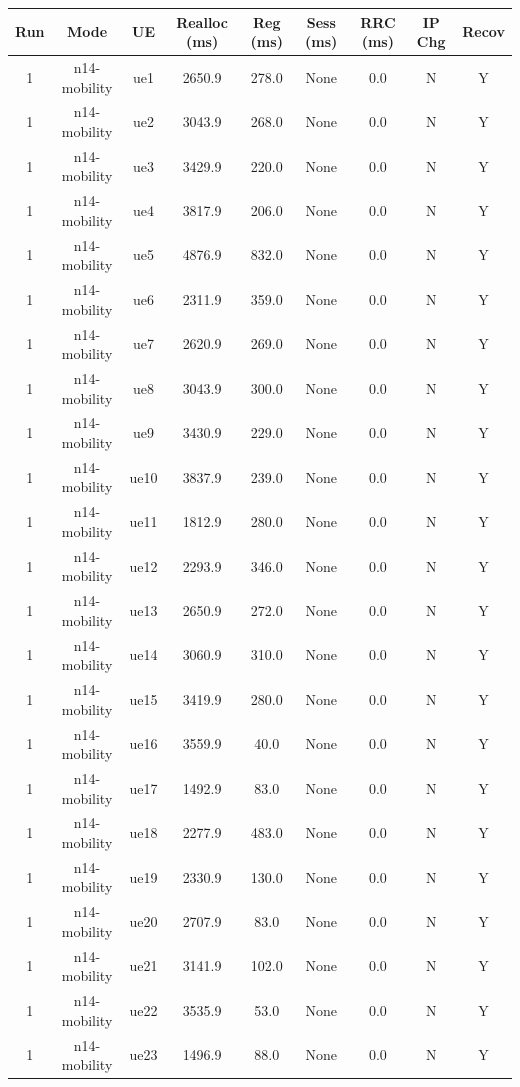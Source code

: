 \begin{table}[ht]
\centering
\begin{tabular}{|c|c|c|c|c|c|c|c|c|}
\hline
Run & Mode & UE & Realloc (ms) & Reg (ms) & Sess (ms) & RRC (ms) & IP Chg & Recov \\
\hline
1 & n14-mobility & ue1 & 2650.9 & 278.0 & None & 0.0 & N & Y \\
1 & n14-mobility & ue2 & 3043.9 & 268.0 & None & 0.0 & N & Y \\
1 & n14-mobility & ue3 & 3429.9 & 220.0 & None & 0.0 & N & Y \\
1 & n14-mobility & ue4 & 3817.9 & 206.0 & None & 0.0 & N & Y \\
1 & n14-mobility & ue5 & 4876.9 & 832.0 & None & 0.0 & N & Y \\
1 & n14-mobility & ue6 & 2311.9 & 359.0 & None & 0.0 & N & Y \\
1 & n14-mobility & ue7 & 2620.9 & 269.0 & None & 0.0 & N & Y \\
1 & n14-mobility & ue8 & 3043.9 & 300.0 & None & 0.0 & N & Y \\
1 & n14-mobility & ue9 & 3430.9 & 229.0 & None & 0.0 & N & Y \\
1 & n14-mobility & ue10 & 3837.9 & 239.0 & None & 0.0 & N & Y \\
1 & n14-mobility & ue11 & 1812.9 & 280.0 & None & 0.0 & N & Y \\
1 & n14-mobility & ue12 & 2293.9 & 346.0 & None & 0.0 & N & Y \\
1 & n14-mobility & ue13 & 2650.9 & 272.0 & None & 0.0 & N & Y \\
1 & n14-mobility & ue14 & 3060.9 & 310.0 & None & 0.0 & N & Y \\
1 & n14-mobility & ue15 & 3419.9 & 280.0 & None & 0.0 & N & Y \\
1 & n14-mobility & ue16 & 3559.9 & 40.0 & None & 0.0 & N & Y \\
1 & n14-mobility & ue17 & 1492.9 & 83.0 & None & 0.0 & N & Y \\
1 & n14-mobility & ue18 & 2277.9 & 483.0 & None & 0.0 & N & Y \\
1 & n14-mobility & ue19 & 2330.9 & 130.0 & None & 0.0 & N & Y \\
1 & n14-mobility & ue20 & 2707.9 & 83.0 & None & 0.0 & N & Y \\
1 & n14-mobility & ue21 & 3141.9 & 102.0 & None & 0.0 & N & Y \\
1 & n14-mobility & ue22 & 3535.9 & 53.0 & None & 0.0 & N & Y \\
1 & n14-mobility & ue23 & 1496.9 & 88.0 & None & 0.0 & N & Y \\

\end{tabular}
\end{table}
